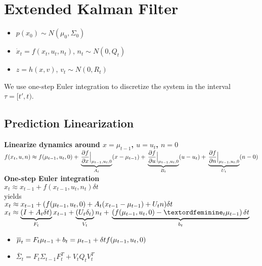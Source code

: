 \section{Extended Kalman Filter}
\begin{itemize}
  \item $p(x_0) \sim N(\mu_0, \Sigma_0)$
  \item $\dot{x}_t = f(x_t, u_t, n_t)$, $n_t\sim N(0, Q_t)$
  \item $z = h(x, v)$, $v_t \sim N(0, R_t)$
\end{itemize}

We use one-step Euler integration to discretize the system in the
interval $\tau = [t', t)$.

\subsection*{Prediction Linearization}
\textbf{Linearize dynamics around $x = \mu_{t-1}$, $u = u_t$, $n = 0$}\\
$f(x_t, u, n) \approx f(\mu_{t-1}, u_t, 0) +\\
\underbrace{\dfrac{\partial f}{\partial x}\Bigr|_{\substack{\mu_{t-1},
u_t, 0}}}_{A_t}(x - \mu_{t-1}) + \\
\underbrace{\dfrac{\partial f}{\partial u}\Bigr|_{\substack{\mu_{t-1},
u_t, 0}}}_{B_t}(u - u_t) +\\
\underbrace{\dfrac{\partial f}{\partial n}\Bigr|_{\substack{\mu_{t-1},
u_t, 0}}}_{U_t}(n - 0)
$\\

\textbf{One-step Euler integration}\\
$x_t \approx x_{t-1} + f(x_{t-1}, u_t, n_t) \delta t$\\
yields\\
$x_t \approx x_{t-1} + (  f(\mu_{t-1}, u_t, 0) + \\
A_t (x_{t-1} - \mu_{t-1})  +  U_t n) \delta t$\\
$x_t \approx \underbrace{(I + A_t \delta t)}_{F_t} x_{t-1}
+ \underbrace{(U_t \delta_t)}_{V_t} n_t + \\
\underbrace{\left( f(\mu_{t-1}, u_t, 0) - ª_t \mu_{t-1}\right) \delta t}_{b_t}$

\begin{itemize}
  \item $\bar{\mu}_t = F_t \mu_{t-1} + b_t \\
    = \mu_{t-1} + \delta t f(\mu_{t-1}, u_t, 0)$
  \item $\bar{\Sigma}_t = F_t \Sigma_{t-1} F_t^T + V_t Q_t
    V_t^T$
\end{itemize}

